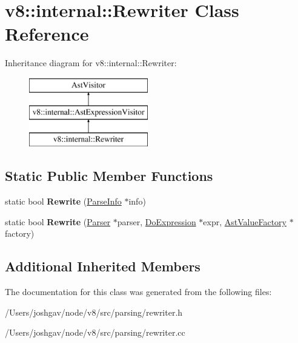\hypertarget{classv8_1_1internal_1_1_rewriter}{}\section{v8\+:\+:internal\+:\+:Rewriter Class Reference}
\label{classv8_1_1internal_1_1_rewriter}
Inheritance diagram for v8\+:\+:internal\+:\+:Rewriter\+:\begin{figure}[H]
\begin{center}
\leavevmode
\includegraphics[height=3.000000cm]{classv8_1_1internal_1_1_rewriter}
\end{center}
\end{figure}
\subsection*{Static Public Member Functions}
\begin{DoxyCompactItemize}
\item 
static bool {\bfseries Rewrite} (\hyperlink{classv8_1_1internal_1_1_parse_info}{Parse\+Info} $\ast$info)\hypertarget{classv8_1_1internal_1_1_rewriter_a6988dcedbc6c2adadf310f7802ebd3ce}{}\label{classv8_1_1internal_1_1_rewriter_a6988dcedbc6c2adadf310f7802ebd3ce}

\item 
static bool {\bfseries Rewrite} (\hyperlink{classv8_1_1internal_1_1_parser}{Parser} $\ast$parser, \hyperlink{classv8_1_1internal_1_1_do_expression}{Do\+Expression} $\ast$expr, \hyperlink{classv8_1_1internal_1_1_ast_value_factory}{Ast\+Value\+Factory} $\ast$factory)\hypertarget{classv8_1_1internal_1_1_rewriter_aef688c90186eca8d6885243d665574dc}{}\label{classv8_1_1internal_1_1_rewriter_aef688c90186eca8d6885243d665574dc}

\end{DoxyCompactItemize}
\subsection*{Additional Inherited Members}


The documentation for this class was generated from the following files\+:\begin{DoxyCompactItemize}
\item 
/\+Users/joshgav/node/v8/src/parsing/rewriter.\+h\item 
/\+Users/joshgav/node/v8/src/parsing/rewriter.\+cc\end{DoxyCompactItemize}
